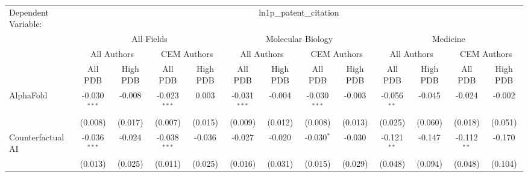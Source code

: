 \begingroup
\centering
\begin{tabular}{lcccccccccccc}
   \tabularnewline \midrule \midrule
   Dependent Variable: & \multicolumn{12}{c}{ln1p\_patent\_citation}\\
 & \multicolumn{4}{c}{All Fields} & \multicolumn{4}{c}{Molecular Biology} & \multicolumn{4}{c}{Medicine} \\
\cmidrule(lr){2-5} \cmidrule(lr){6-9} \cmidrule(lr){10-13}
 & \multicolumn{2}{c}{All Authors} & \multicolumn{2}{c}{CEM Authors} & \multicolumn{2}{c}{All Authors} & \multicolumn{2}{c}{CEM Authors} & \multicolumn{2}{c}{All Authors} & \multicolumn{2}{c}{CEM Authors} \\
\cmidrule(lr){2-3} \cmidrule(lr){4-5} \cmidrule(lr){6-7} \cmidrule(lr){8-9} \cmidrule(lr){10-11} \cmidrule(lr){12-13}
 & \multicolumn{1}{c}{All PDB} & \multicolumn{1}{c}{High PDB} & \multicolumn{1}{c}{All PDB} & \multicolumn{1}{c}{High PDB} & \multicolumn{1}{c}{All PDB} & \multicolumn{1}{c}{High PDB} & \multicolumn{1}{c}{All PDB} & \multicolumn{1}{c}{High PDB} & \multicolumn{1}{c}{All PDB} & \multicolumn{1}{c}{High PDB} & \multicolumn{1}{c}{All PDB} & \multicolumn{1}{c}{High PDB} \\
\cmidrule(lr){2-2} \cmidrule(lr){3-3} \cmidrule(lr){4-4} \cmidrule(lr){5-5} \cmidrule(lr){6-6} \cmidrule(lr){7-7} \cmidrule(lr){8-8} \cmidrule(lr){9-9} \cmidrule(lr){10-10} \cmidrule(lr){11-11} \cmidrule(lr){12-12} \cmidrule(lr){13-13}
   AlphaFold                                                  & -0.030$^{***}$ & -0.008         & -0.023$^{***}$ & 0.003         & -0.031$^{***}$ & -0.004         & -0.030$^{***}$ & -0.003         & -0.056$^{**}$  & -0.045        & -0.024        & -0.002\\   
                                                              & (0.008)        & (0.017)        & (0.007)        & (0.015)       & (0.009)        & (0.012)        & (0.008)        & (0.013)        & (0.025)        & (0.060)       & (0.018)       & (0.051)\\   
   Counterfactual AI                                          & -0.036$^{***}$ & -0.024         & -0.038$^{***}$ & -0.036        & -0.027         & -0.020         & -0.030$^{*}$   & -0.030         & -0.121$^{**}$  & -0.147        & -0.112$^{**}$ & -0.170\\   
                                                              & (0.013)        & (0.025)        & (0.011)        & (0.025)       & (0.016)        & (0.031)        & (0.015)        & (0.029)        & (0.048)        & (0.094)       & (0.048)       & (0.104)\\   

\end{tabular}
